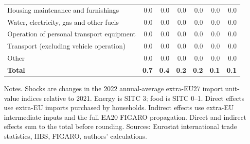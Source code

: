 \begin{table}[H]
{\begin{tabular}[t]{lrrrrrr}
Housing maintenance and furnishings & 0.0 & 0.0 & 0.0 & 0.0 & 0.0 & 0.0\\
Water, electricity, gas and other fuels & 0.0 & 0.0 & 0.0 & 0.0 & 0.0 & 0.0\\
Operation of personal transport equipment & 0.0 & 0.0 & 0.0 & 0.0 & 0.0 & 0.0\\
Transport (excluding vehicle operation) & 0.0 & 0.0 & 0.0 & 0.0 & 0.0 & 0.0\\
Other & 0.0 & 0.0 & 0.0 & 0.0 & 0.0 & 0.0\\
\textbf{Total} & \textbf{0.7} & \textbf{0.4} & \textbf{0.2} & \textbf{0.2} & \textbf{0.1} & \textbf{0.1}\\
\bottomrule
\end{tabular}
}%
\par\vspace{0.35em}\footnotesize\noindent Notes. Shocks are changes in the 2022 annual-average extra-EU27 import unit-value indices relative to 2021. Energy is SITC 3; food is SITC 0--1. Direct effects use extra-EU imports purchased by households. Indirect effects use extra-EU intermediate inputs and the full EA20 FIGARO propagation. Direct and indirect effects sum to the total before rounding. Sources: Eurostat international trade statistics, HBS, FIGARO, authors' calculations.
\end{table}
